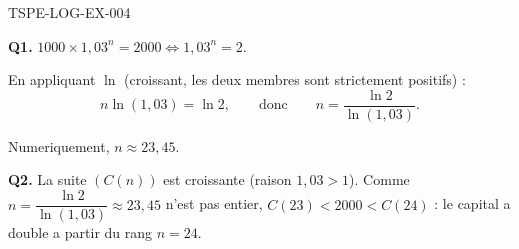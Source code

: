 \begin{corrige}{TSPE-LOG-EX-004}

\textbf{Q1.} $1000 \times 1{,}03^n = 2000 \iff 1{,}03^n = 2$.

En appliquant $\ln$ (croissant, les deux membres sont strictement positifs) :
\[
  n \ln(1{,}03) = \ln 2, \qquad \text{donc} \qquad n = \frac{\ln 2}{\ln(1{,}03)}.
\]

Numeriquement, $n \approx 23{,}45$.

\textbf{Q2.} La suite $(C(n))$ est croissante (raison $1{,}03>1$). Comme $n = \dfrac{\ln 2}{\ln(1{,}03)} \approx 23{,}45$ n'est pas entier, $C(23) < 2000 < C(24)$ : le capital a double a partir du rang $n=24$.

\end{corrige}
